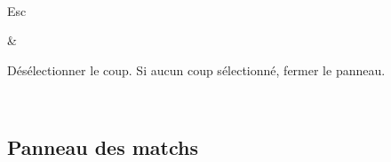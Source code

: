 \documentclass[letterpaper,10pt,french]{sphinxmanual}
\begin{document}
\begin{savenotes}
\begin{tabular}[t]{}
\\
\sphinxhline\begin{varwidth}[t]{}
\sphinxAtStartPar
Esc
\sphinxbeforeendvarwidth
\end{varwidth}%
&\begin{varwidth}[t]{}
\sphinxAtStartPar
Désélectionner le coup. Si aucun coup sélectionné, fermer le panneau.
\sphinxbeforeendvarwidth
\end{varwidth}%
\\
\sphinxbottomrule
\end{tabular}
\sphinxtableafterendhook\par
\sphinxattableend\end{savenotes}


\subsection{Panneau des matchs}
\label{\detokenize{raccourcis:panneau-des-matchs}}\label{\detokenize{raccourcis:raccourcis-match-panel}}
\end{document}
